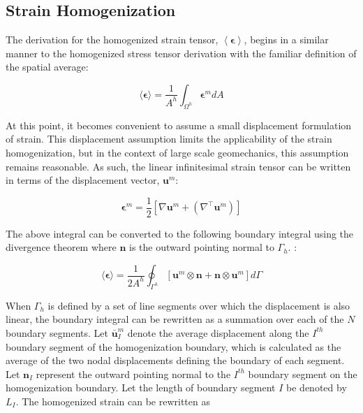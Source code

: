 \subsection{Strain Homogenization}

The derivation for the homogenized strain tensor, $\left< \boldsymbol{\epsilon}\right>$, begins in a similar manner to the homogenized stress tensor derivation with the familiar definition of the spatial average:

\begin{equation}
\langle\boldsymbol{\epsilon}\rangle=\frac{1}{A^{h}}\int_{\Omega^{h}}\boldsymbol{\epsilon}^m dA\label{eqn:strain2}
\end{equation}

At this point, it becomes convenient to assume a small displacement formulation of strain. This displacement assumption limits the applicability of the strain homogenization, but in the context of large scale geomechanics, this assumption remains reasonable. As such, the linear infinitesimal strain tensor can be written in terms of the displacement vector, $\mathbf{u}^m$:

\begin{equation}
\boldsymbol{\epsilon}^m=\frac{1}{2}\left[\nabla\mathbf{u}^m+\left(\nabla^\top \mathbf{u}^m\right)\right]\label{eqn:strain1}
\end{equation}

The above integral can be converted to the following boundary integral using the divergence theorem where $\mathbf{n}$ is the outward pointing normal to $\Gamma_h$. :

\begin{equation}
\langle\boldsymbol{\epsilon}\rangle=\frac{1}{2A^{h}}\oint_{\Gamma^{h}}\left[\mathbf{u}^m\otimes\mathbf{n}+\mathbf{n}\otimes\mathbf{u}^m\right]d\Gamma\label{eqn:strain5-1}
\end{equation}

When $\Gamma_h$ is defined by a set of line segments over which the displacement is also linear, the boundary integral can be rewritten as a summation over each of the $N$ boundary segments. Let $\bar{\mathbf{u}}^m_{I}$ denote the average displacement along the $I^{th}$ boundary segment of the homogenization boundary, which is calculated as the average of the two nodal displacements defining the boundary of each segment. Let $\mathbf{n}_{I}$ represent the outward pointing normal to the $I^{th}$ boundary segment on the homogenization boundary.  Let the length of boundary segment $I$ be denoted by $L_{I}$. The homogenized strain can be rewritten as

